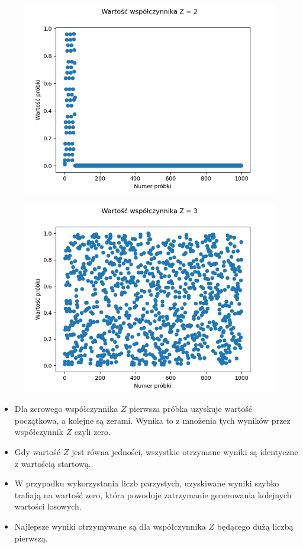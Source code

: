 \documentclass[12pt,a4paper]{article}
\begin{document}
  \begin{figure}[H]
    \centering
    \includegraphics[height=0.3\textheight]{figures/Figure_8.png}
    \label{fig:8}
  \end{figure}

  \begin{figure}[H]
    \centering
    \includegraphics[height=0.3\textheight]{figures/Figure_9.png}
    \label{fig:9}
  \end{figure}
  
  \begin{itemize}
    \item Dla zerowego współczynnika $Z$ pierwsza próbka uzyskuje wartość początkowa, a kolejne są zerami. Wynika to z mnożenia tych wyników przez współczynnik $Z$ czyli zero.
    \item Gdy wartość $Z$ jest równa jedności, wszystkie otrzymane wyniki są identyczne z wartością startową.
    \item W przypadku wykorzystania liczb parzystych, uzyskiwane wyniki szybko trafiają na wartość zero, która powoduje zatrzymanie generowania kolejnych wartości losowych. 
    \item Najlepsze wyniki otrzymywane są dla współczynnika $Z$ będącego dużą liczbą pierwszą. 
  \end{itemize}
\end{document}
